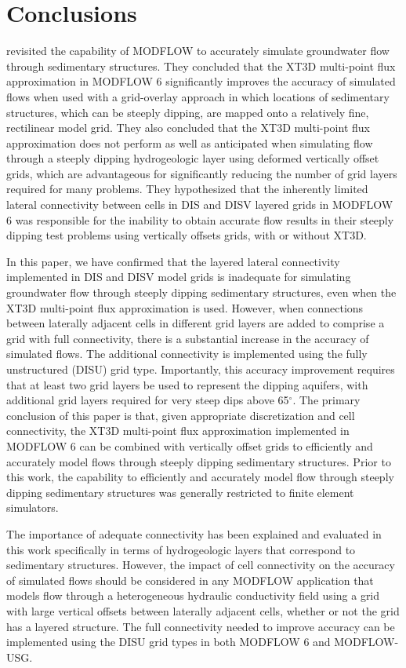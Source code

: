 \documentclass{article}
\begin{document}
\section{Conclusions}

 \cite{bardot2022} revisited the capability of MODFLOW to accurately simulate groundwater flow through sedimentary structures.  They concluded that the XT3D multi-point flux approximation in MODFLOW 6 significantly improves the accuracy of simulated flows when used with a grid-overlay approach in which locations of sedimentary structures, which can be steeply dipping, are mapped onto a relatively fine, rectilinear model grid.  They also concluded that the XT3D multi-point flux approximation does not perform as well as anticipated when simulating flow through a steeply dipping hydrogeologic layer using deformed vertically offset grids, which are advantageous for significantly reducing the number of grid layers required for many problems.  They hypothesized that the inherently limited lateral connectivity between cells in DIS and DISV layered grids in MODFLOW 6 was responsible for the inability to obtain accurate flow results in their steeply dipping test problems using vertically offsets grids, with or without XT3D.

In this paper, we have confirmed that the layered lateral connectivity implemented in DIS and DISV model grids is inadequate for simulating groundwater flow through steeply dipping sedimentary structures, even when the XT3D multi-point flux approximation is used.  However, when connections between laterally adjacent cells in different grid layers are added to comprise a grid with full connectivity, there is a substantial increase in the accuracy of simulated flows.  The additional connectivity is implemented using the fully unstructured (DISU) grid type.  Importantly, this accuracy improvement requires that at least two grid layers be used to represent the dipping aquifers, with additional grid layers required for very steep dips above 65$^{\circ}$.  The primary conclusion of this paper is that, given appropriate discretization and cell connectivity, the XT3D multi-point flux approximation implemented in MODFLOW 6 can be combined with vertically offset grids to efficiently and accurately model flows through steeply dipping sedimentary structures.  Prior to this work, the capability to efficiently and accurately model flow through steeply dipping sedimentary structures was generally restricted to finite element simulators.

The importance of adequate connectivity has been explained and evaluated in this work specifically in terms of hydrogeologic layers that correspond to sedimentary structures. However, the impact of cell connectivity on the accuracy of simulated flows should be considered in any MODFLOW application that models flow through a heterogeneous hydraulic conductivity field using a grid with large vertical offsets between laterally adjacent cells, whether or not the grid has a layered structure. The full connectivity needed to improve accuracy can be implemented using the DISU grid types in both MODFLOW 6 and MODFLOW-USG.
\end{document}
